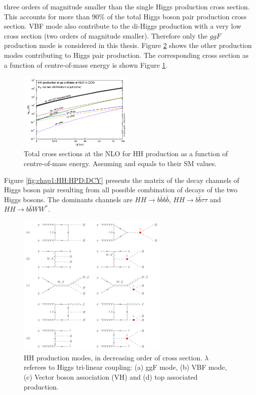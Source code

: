 three orders of magnitude smaller than the single Higgs production cross section. This accounts for more than 90\% of the total Higgs boson pair production cross section. VBF mode also contribute to the di-Higgs production with a very low cross section (two orders of magnitude smaller). Therefore only the $ggF$ production mode is considered in this thesis. Figure \ref{fig:chap1:HH:HPD:FYS} shows the other production modes contributing to Higgs pair production. The corresponding cross section as a function of centre-of-mass energy is shown Figure \ref{fig:chap1:HH:BSM:XSEC:S}. \\
\begin{figure}[H]
    \centering
    \includegraphics[width=0.5\textwidth]{Ch1/Img/HH_XSec_as_S.png}
    \caption{Total cross sections at the NLO for HH production as a function of centre-of-mass energy. Assuming \kl and \kt equals to their SM values.}
    \label{fig:chap1:HH:BSM:XSEC:S}
\end{figure}
Figure \ref{fig:chap1:HH:HPD:DCY} presents the matrix of the decay channels of Higgs boson pair resulting from all possible combination of decays of the two Higgs bosons. The dominants channels are $HH\rightarrow b\bar{b}b\bar{b}$, $HH\rightarrow b\bar{b}\tau\tau$ and $HH\rightarrow b\bar{b}WW^*$. 
\begin{figure}[H]
    \centering
    \includegraphics[width=0.65\textwidth]{Ch1/Img/HH_feyns.png}
    \caption{HH production modes, in decreasing order of cross section. $\lambda$ referees to Higgs tri-linear coupling: (a) ggF mode, (b) VBF mode, (c) Vector boson association (VH) and (d) top associated production.}
    \label{fig:chap1:HH:HPD:FYS}
\end{figure}
